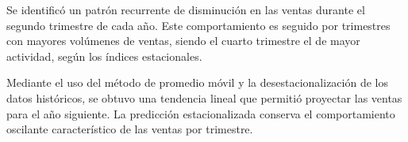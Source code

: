 Se identificó un patrón recurrente de disminución en las ventas durante el
segundo trimestre de cada año.
Este comportamiento es seguido por trimestres con mayores volúmenes de ventas,
siendo el cuarto trimestre el de mayor actividad, según los índices estacionales.

Mediante el uso del método de promedio móvil y la desestacionalización de los
datos históricos, se obtuvo una tendencia lineal que permitió proyectar las
ventas para el año siguiente.
La predicción estacionalizada conserva el comportamiento oscilante
característico de las ventas por trimestre.

